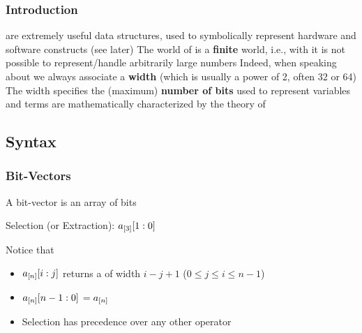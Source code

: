 \begin{frame}
  \frametitle{Introduction}

  \bitvectors are extremely useful data structures,
  used to symbolically represent hardware and software
  constructs (see later)
  \vfill
  \pause
  The world of \bitvectors is a {\bf finite} world, i.e.,
  with \bitvectors it is not possible to represent/handle 
  arbitrarily large numbers 
  \vfill
  \pause
  Indeed, when speaking about \bitvectors we always
  associate a {\bf width}  
  (which is usually a power of 2, often 32 or 64)
  \vfill
  \pause
  The width specifies the (maximum) {\bf number of bits} used to
  represent variables and terms
  \vfill
  \pause
  \bitvector \formulae are mathematically characterized by 
  the theory of \bitvectors \Bitvectors
  
\end{frame}

\subsection{Syntax}

\begin{frame}
  \frametitle{Bit-Vectors}
  
  A bit-vector is an array of bits 
  \smallskip \\
  \begin{center}
  \scalebox{.3}{}
  \end{center} 
  \vfill
  \pause

  Selection (or Extraction): $a_{[3]}[1:0]$ 
  \smallskip \\
  \begin{center}
  \scalebox{.3}{} 
  \end{center}

  \vfill
  \pause

  Notice that
  \begin{itemize}
    \item $a_{[n]}[i:j]$ returns a \bitvector of width $i - j + 1$ ($0 \leq j \leq i \leq n - 1$) \pause
    \item $a_{[n]}[n-1:0]$ \pause $= a_{[n]}$ \pause
    \item Selection has precedence over any other operator
  \end{itemize}

\end{frame}

